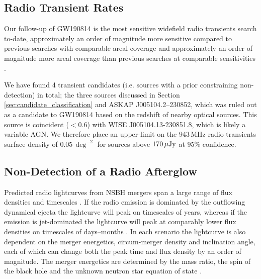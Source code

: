 \subsection{Radio Transient Rates}
\vspace{-5pt}
Our follow-up of GW190814 is the most sensitive widefield radio transients search to-date, approximately an order of magnitude more sensitive compared to previous searches with comparable areal coverage \citep{2016MNRAS.456.3948H} and approximately an order of magnitude more areal coverage than previous searches at comparable sensitivities \citep{2013ApJ...768..165M}.

We have found 4 transient candidates (i.e. sources with a prior constraining non-detection) in total; the three sources discussed in Section \ref{sec:candidate_classification} and ASKAP J005104.2--230852, which was ruled out as a candidate to GW190814 based on the redshift of nearby optical sources. This source is coincident ($<0.6$\arcsec) with WISE J005104.13-230851.8, which  is likely a variable AGN. We therefore place an upper-limit on the 943\,MHz radio transients surface density of $0.05\,\deg^{-2}$ for sources above $170\,\mu{\rm Jy}$ at 95\% confidence.

\subsection{Non-Detection of a Radio Afterglow}
\label{subsec:gw190814_nondetection}
\vspace{-5pt}
Predicted radio lightcurves from NSBH mergers span a large range of flux densities and timescales \citep[e.g.][]{2013MNRAS.430.2121P,2016ApJ...829..112L,2019MNRAS.486.5289B}. If the radio emission is dominated by the outflowing dynamical ejecta the lightcurve will peak on timescales of years, whereas if the emission is jet-dominated the lightcurve will peak at comparably lower flux densities on timescales of days--months \citep{2016ApJ...831..190H}. In each scenario the lightcurve is also dependent on the merger energetics, circum-merger density and inclination angle, each of which can change both the peak time and flux density by an order of magnitude. The merger energetics are determined by the mass ratio, the spin of the black hole \citep{2020ApJ...896L..44A} and the unknown neutron star equation of state \citep{2011PhRvD..84f4018K,2012PhRvD..86l4007F}.

